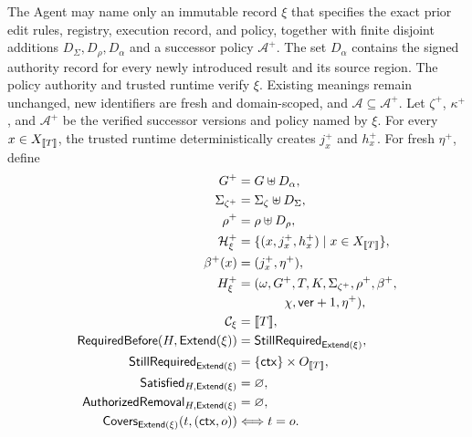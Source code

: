 The Agent may name only an immutable record \(\xi\) that specifies the exact prior edit rules, registry, execution record, and policy, together with finite disjoint additions \(D_\Sigma,D_\rho,D_\alpha\) and a successor policy \(\mathcal A^+\).
The set \(D_\alpha\) contains the signed authority record for every newly introduced result and its source region.
The policy authority and trusted runtime verify \(\xi\).
Existing meanings remain unchanged, new identifiers are fresh and domain-scoped, and \(\mathcal A\subseteq\mathcal A^+\).
Let \(\zeta^+\), \(\kappa^+\), and \(\mathcal A^+\) be the verified successor versions and policy named by \(\xi\).
For every \(x\in X_{\mathopen{[\![}T\mathclose{]\!]}}\), the trusted runtime deterministically creates \(j_x^+\) and \(h_x^+\).
For fresh \(\eta^+\), define
\[
\begin{aligned}
 G^+&=G\uplus D_\alpha,\\
 \Sigma_{\zeta^+}&=\Sigma_\zeta\uplus D_\Sigma,\\
 \rho^+&=\rho\uplus D_\rho,\\
 \mathcal H_\xi^+
   &=\{(x,j_x^+,h_x^+)\mid x\in X_{\sem T}\},\\
 \beta^+(x)&=(j_x^+,\eta^+),\\
 H_\xi^+
   &= (\omega,G^+,T,K,\Sigma_{\zeta^+},\rho^+,\beta^+,\\[-2pt]
   &\hspace{13mm}\chi,\mathsf{ver}+1,\eta^+),\\
 \mathcal C_\xi&=\sem T,\\
 \mathsf{RequiredBefore}(H,\mathsf{Extend}(\xi))
   &=\mathsf{StillRequired}_{\mathsf{Extend}(\xi)},\\
 \mathsf{StillRequired}_{\mathsf{Extend}(\xi)}
   &=\{\mathsf{ctx}\}\times O_{\sem T},\\
 \mathsf{Satisfied}_{H,\mathsf{Extend}(\xi)}&=\varnothing,\\
 \mathsf{AuthorizedRemoval}_{H,\mathsf{Extend}(\xi)}&=\varnothing,\\
 \mathsf{Covers}_{\mathsf{Extend}(\xi)}
   (t,(\mathsf{ctx},o))
   &\Longleftrightarrow t=o .
\end{aligned}
\]
